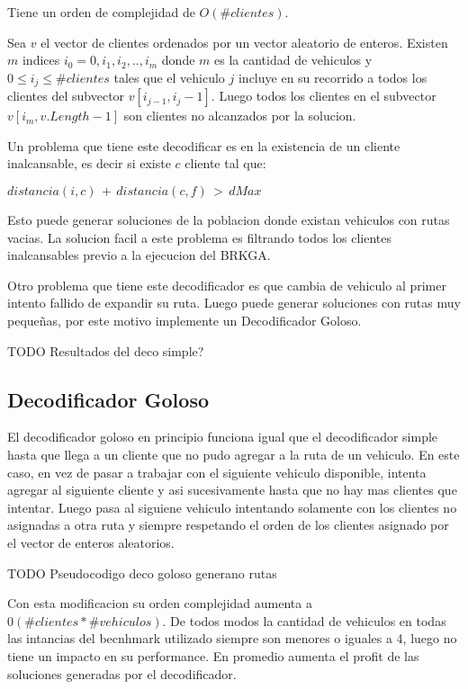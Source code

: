Tiene un orden de complejidad de $O(\#clientes)$.

\bigskip

Sea $v$ el vector de clientes ordenados por un vector aleatorio de enteros. Existen $m$ indices $i_0 = 0, i_1, i_2, .., i_m$ donde $m$ es la cantidad de vehiculos y $0 \leq i_j \leq \#clientes$ tales que el vehiculo $j$ incluye en su recorrido a todos los clientes del subvector $v[i_{j-1}, i_j-1]$. Luego todos los clientes en el subvector $v[i_m, v.Length - 1]$ son clientes no alcanzados por la solucion.

\bigskip

Un problema que tiene este decodificar es en la existencia de un cliente inalcansable, es decir si existe $c$ cliente tal que:

\( distancia(i, c)\, +\, distancia(c, f)\, >\, dMax\)

Esto puede generar soluciones de la poblacion donde existan vehiculos con rutas vacias. La solucion facil a este problema es filtrando todos los clientes inalcansables previo a la ejecucion del BRKGA.

\bigskip

Otro problema que tiene este decodificador es que cambia de vehiculo al primer intento fallido de expandir su ruta. Luego puede generar soluciones con rutas muy pequeñas, por este motivo implemente un Decodificador Goloso.

\bigskip

TODO Resultados del deco simple?

\subsection{Decodificador Goloso}

El decodificador goloso en principio funciona igual que el decodificador simple hasta que llega a un cliente que no pudo agregar a la ruta de un vehiculo. En este caso, en vez de pasar a trabajar con el siguiente vehiculo disponible, intenta agregar al siguiente cliente y asi sucesivamente hasta que no hay mas clientes que intentar. Luego pasa al siguiene vehiculo intentando solamente con los clientes no asignadas a otra ruta y siempre respetando el orden de los clientes asignado por el vector de enteros aleatorios.

\bigskip

TODO Pseudocodigo deco goloso generano rutas

\bigskip

Con esta modificacion su orden complejidad aumenta a $0(\#clientes * \#vehiculos)$. De todos modos la cantidad de vehiculos en todas las intancias del becnhmark utilizado siempre son menores o iguales a 4, luego no tiene un impacto en su performance. En promedio aumenta el profit de las soluciones generadas por el decodificador.

